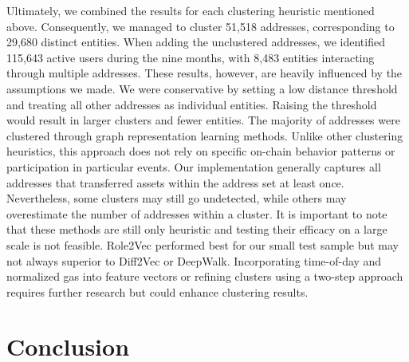 \documentclass[12pt,a4paper,titlepage,oneside,english]{article}
\begin{document}
Ultimately, we combined the results for each clustering heuristic mentioned above. Consequently, we managed to cluster 51,518 addresses, corresponding to 29,680 distinct entities. When adding the unclustered addresses, we identified 115,643 active users during the nine months, with 8,483 entities interacting through multiple addresses. \newline
These results, however, are heavily influenced by the assumptions we made. We were conservative by setting a low distance threshold and treating all other addresses as individual entities. Raising the threshold would result in larger clusters and fewer entities. \newline 
The majority of addresses were clustered through graph representation learning methods. Unlike other clustering heuristics, this approach does not rely on specific on-chain behavior patterns or participation in particular events. Our implementation generally captures all addresses that transferred assets within the address set at least once. Nevertheless, some clusters may still go undetected, while others may overestimate the number of addresses within a cluster. It is important to note that these methods are still only heuristic and testing their efficacy on a large scale is not feasible. \newline
Role2Vec performed best for our small test sample but may not always superior to Diff2Vec or DeepWalk. Incorporating time-of-day and normalized gas into feature vectors or refining clusters using a two-step approach requires further research but could enhance clustering results.


\section{Conclusion}

\end{document}
